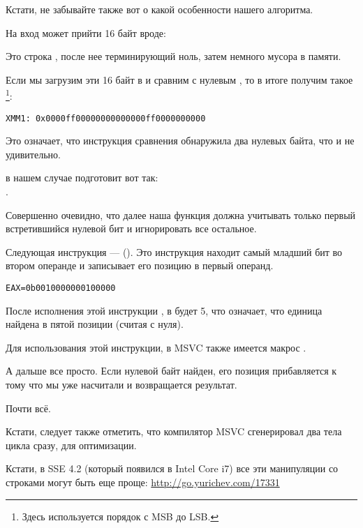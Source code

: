 Кстати, не забывайте также вот о какой особенности нашего алгоритма.

На вход может прийти 16 байт вроде:



Это строка , после нее терминирующий ноль, затем немного мусора в памяти.

Если мы загрузим эти 16 байт в  и сравним с нулевым , то в итоге получим такое 
\footnote{Здесь используется порядок с \ac{MSB} до \ac{LSB}.}:

\begin{verbatim}
XMM1: 0x0000ff00000000000000ff0000000000
\end{verbatim}

Это означает, что инструкция сравнения обнаружила два нулевых байта, что и не удивительно.

 в нашем случае подготовит \EAX вот так:\\
.

Совершенно очевидно, что далее наша функция должна учитывать только первый встретившийся
нулевой бит и игнорировать все остальное.

\label{instruction_BSF}
Следующая инструкция ---  (). 
Это инструкция находит самый младший бит во втором операнде и записывает его позицию в первый операнд.

\begin{verbatim}
EAX=0b0010000000100000
\end{verbatim}

После исполнения этой инструкции , в \EAX будет 5, что означает, 
что единица найдена в пятой позиции (считая с нуля).

Для использования этой инструкции, в MSVC также имеется макрос .

А дальше все просто. Если нулевой байт найден, его позиция прибавляется к тому что 
мы уже насчитали и возвращается результат.

Почти всё.

Кстати, следует также отметить, что компилятор MSVC сгенерировал два тела цикла сразу, для оптимизации.

Кстати, в SSE 4.2 (который появился в Intel Core i7) все эти манипуляции со строками могут быть еще проще:
 \url{http://go.yurichev.com/17331}
